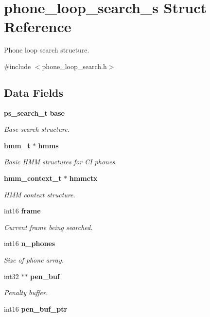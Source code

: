 \section{phone\-\_\-loop\-\_\-search\-\_\-s Struct Reference}
\label{structphone__loop__search__s}


Phone loop search structure.  




{\ttfamily \#include $<$phone\-\_\-loop\-\_\-search.\-h$>$}

\subsection*{Data Fields}
\begin{DoxyCompactItemize}
\item 
{\bf ps\-\_\-search\-\_\-t} {\bf base}
\begin{DoxyCompactList}\small\item\em Base search structure. \end{DoxyCompactList}\item 
{\bf hmm\-\_\-t} $\ast$ {\bf hmms}
\begin{DoxyCompactList}\small\item\em Basic H\-M\-M structures for C\-I phones. \end{DoxyCompactList}\item 
{\bf hmm\-\_\-context\-\_\-t} $\ast$ {\bf hmmctx}
\begin{DoxyCompactList}\small\item\em H\-M\-M context structure. \end{DoxyCompactList}\item 
int16 {\bf frame}
\begin{DoxyCompactList}\small\item\em Current frame being searched. \end{DoxyCompactList}\item 
int16 {\bf n\-\_\-phones}
\begin{DoxyCompactList}\small\item\em Size of phone array. \end{DoxyCompactList}\item 
int32 $\ast$$\ast$ {\bf pen\-\_\-buf}\label{structphone__loop__search__s_ad9233a565738a5097097bab89193e2c5}

\begin{DoxyCompactList}\small\item\em Penalty buffer. \end{DoxyCompactList}\item 
int16 {\bf pen\-\_\-buf\-\_\-ptr}\label{structphone__loop__search__s_a630510d46979533e7acfd1e70d80ea97}


\end{DoxyCompactItemize}
